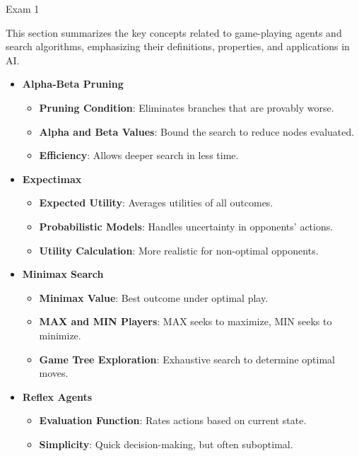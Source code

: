 \begin{examnotes}{Exam 1}
    \begin{highlight}
        This section summarizes the key concepts related to game-playing agents and search algorithms, emphasizing their definitions, properties, and applications in AI.
        
        \begin{itemize}
            \item \textbf{Alpha-Beta Pruning}
                \begin{itemize}
                    \item \textbf{Pruning Condition}: Eliminates branches that are provably worse.
                    \item \textbf{Alpha and Beta Values}: Bound the search to reduce nodes evaluated.
                    \item \textbf{Efficiency}: Allows deeper search in less time.
                \end{itemize}
            \item \textbf{Expectimax}
                \begin{itemize}
                    \item \textbf{Expected Utility}: Averages utilities of all outcomes.
                    \item \textbf{Probabilistic Models}: Handles uncertainty in opponents' actions.
                    \item \textbf{Utility Calculation}: More realistic for non-optimal opponents.
                \end{itemize}
            \item \textbf{Minimax Search}
                \begin{itemize}
                    \item \textbf{Minimax Value}: Best outcome under optimal play.
                    \item \textbf{MAX and MIN Players}: MAX seeks to maximize, MIN seeks to minimize.
                    \item \textbf{Game Tree Exploration}: Exhaustive search to determine optimal moves.
                \end{itemize}
            \item \textbf{Reflex Agents}
                \begin{itemize}
                    \item \textbf{Evaluation Function}: Rates actions based on current state.
                    \item \textbf{Simplicity}: Quick decision-making, but often suboptimal.

\end{itemize}
\end{itemize}
\end{highlight}
\end{examnotes}
